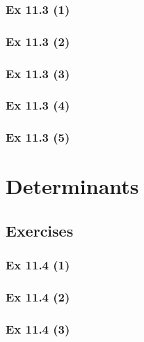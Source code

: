 \subsubsection{Ex 11.3 (1)}\label{sec:Ex_11.3.1}

\subsubsection{Ex 11.3 (2)}\label{sec:Ex_11.3.2}

\subsubsection{Ex 11.3 (3)}\label{sec:Ex_11.3.3}

\subsubsection{Ex 11.3 (4)}\label{sec:Ex_11.3.4}

\subsubsection{Ex 11.3 (5)}\label{sec:Ex_11.3.5}

\newpage		%

\section{Determinants}\label{sec:11.4}	
\subsection*{Exercises}\label{sec:11.4_Exercises}

\subsubsection{Ex 11.4 (1)}\label{sec:Ex_11.4.1}

\subsubsection{Ex 11.4 (2)}\label{sec:Ex_11.4.2}

\subsubsection{Ex 11.4 (3)}\label{sec:Ex_11.4.3}

